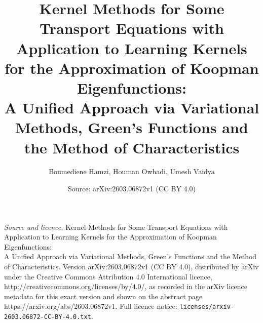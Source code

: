 \documentclass[10pt,a4paper]{amsart}
\title{Kernel Methods for Some Transport Equations with Application to Learning Kernels for the Approximation of Koopman Eigenfunctions: \\ A Unified Approach via Variational Methods, Green’s Functions and the Method of Characteristics}
\author{Boumediene Hamzi, Houman Owhadi, Umesh Vaidya}
\date{Source: arXiv:2603.06872v1 (CC BY 4.0)}
\begin{document}
\maketitle

\noindent\emph{Source and licence.} Kernel Methods for Some Transport Equations with Application to Learning Kernels for the Approximation of Koopman Eigenfunctions: \\ A Unified Approach via Variational Methods, Green’s Functions and the Method of Characteristics. Version arXiv:2603.06872v1 (CC BY 4.0), distributed by arXiv under the Creative Commons Attribution 4.0 International licence, http://creativecommons.org/licenses/by/4.0/, as recorded in the arXiv licence metadata for this exact version and shown on the abstract page https://arxiv.org/abs/2603.06872v1. Full licence notice: \texttt{licenses/arxiv-2603.06872-CC-BY-4.0.txt}.\par\smallskip
\end{document}

